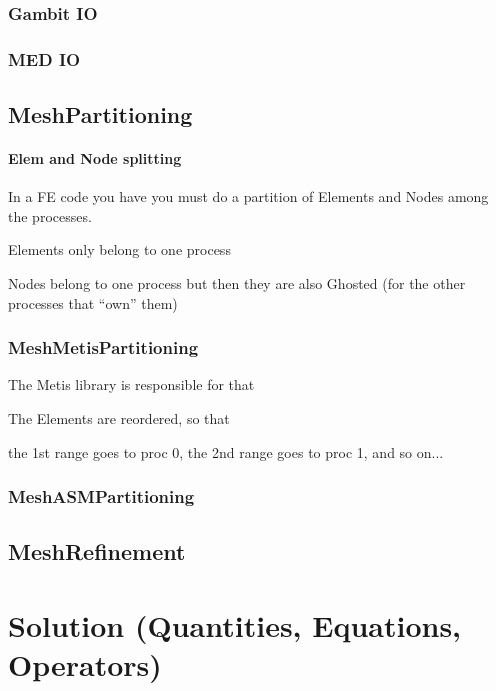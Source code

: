 \documentclass[10pt]{book}
\begin{document}
    \subsection{Gambit IO}
    
    \subsection{MED IO}
    
    
    
  \section{MeshPartitioning}
  
  
  \subsubsection{Elem and Node splitting}
 
 In a FE code you have you must do a partition of Elements and Nodes among the processes.

 Elements only belong to one process
 
 Nodes belong to one process but then they are also Ghosted (for the other processes that ``own'' them)
 
    \subsection{MeshMetisPartitioning}

  The Metis library is responsible for that

  
  The Elements are reordered, so that 
  
  the 1st range goes to proc 0, the 2nd range goes to proc 1, and so on...
  
  
    \subsection{MeshASMPartitioning}
  

  
  \section{MeshRefinement}

  \chapter{Solution (Quantities, Equations, Operators)}
\end{document}
